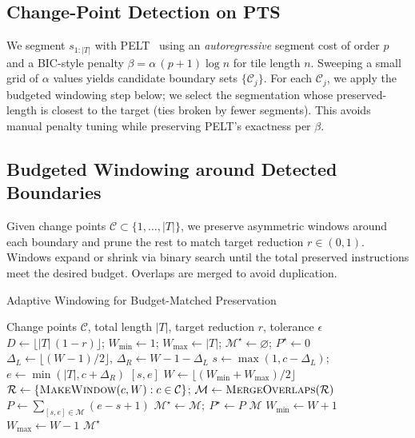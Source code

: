 \documentclass[10pt,journal,compsoc]{IEEEtran}
\newcommand{\pts}{\textsc{PTS}}
\newcommand{\pelt}{\textsc{PELT}}
\begin{document}
\subsection{Change-Point Detection on \pts}
\label{subsec:cpd}
We segment \(s_{1:|T|}\) with \pelt~\cite{pelt12} using an \emph{autoregressive} segment cost of order \(p\) and a BIC-style penalty \(\beta=\alpha\,(p{+}1)\log n\) for tile length \(n\). Sweeping a small grid of \(\alpha\) values yields candidate boundary sets \(\{\mathcal{C}_j\}\). For each \(\mathcal{C}_j\), we apply the budgeted windowing step below; we select the segmentation whose preserved-length is closest to the target (ties broken by fewer segments). This avoids manual penalty tuning while preserving \pelt’s exactness per \(\beta\).
\subsection{Budgeted Windowing around Detected Boundaries}
Given change points \(\mathcal{C}\subset\{1,\ldots,|T|\}\), we preserve asymmetric windows around each boundary and prune the rest to match target reduction \(r\in(0,1)\). Windows expand or shrink via binary search until the total preserved instructions meet the desired budget. Overlaps are merged to avoid duplication.
\begin{algorithm}[t]
\caption{Adaptive Windowing for Budget-Matched Preservation}
\label{alg:adaptive}
\small
\begin{algorithmic}[1]
\Require Change points \(\mathcal{C}\), total length \(|T|\), target reduction \(r\), tolerance \(\epsilon\)
\State \(D\gets \lfloor |T|\,(1-r)\rfloor\); \(W_{\min}\gets 1\); \(W_{\max}\gets |T|\); \(\mathcal{M}^\star\gets\varnothing\); \(P^\star\gets 0\)
  \State \(\Delta_L\gets\lfloor(W-1)/2\rfloor\), \(\Delta_R\gets W-1-\Delta_L\)
  \State \(s\gets\max(1,c-\Delta_L)\); \(e\gets\min(|T|,c+\Delta_R)\)
  \State \Return \([s,e]\)
\EndFunction
{}
  \State \(W\gets\lfloor(W_{\min}+W_{\max})/2\rfloor\)
  \State \(\mathcal{R}\gets \{\textsc{MakeWindow}(c,W):c\in\mathcal{C}\}\); \(\mathcal{M}\gets \textsc{MergeOverlaps}(\mathcal{R})\)
  \State \(P\gets\sum_{[s,e]\in\mathcal{M}}(e-s+1)\)
   \(\mathcal{M}^\star\gets\mathcal{M};\ P^\star\gets P\) \EndIf
   \Return \(\mathcal{M}\) \EndIf
   \(W_{\min}\gets W+1\) \Else \(W_{\max}\gets W-1\) \EndIf
\EndWhile
\State \Return \(\mathcal{M}^\star\)
\end{algorithmic}
\end{algorithm}
\end{document}
